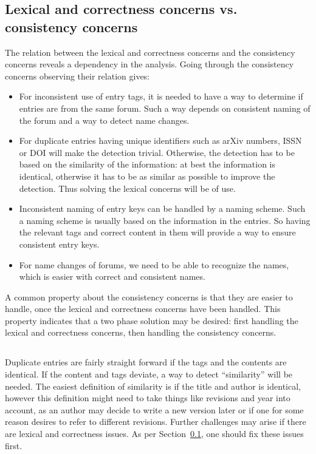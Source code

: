 \subsection{Lexical and correctness concerns vs. consistency concerns}
\label{sec:approach_lexical_consistency}

The relation between the lexical and correctness concerns and the
consistency concerns reveals a dependency in the analysis.  Going
through the consistency concerns observing their relation gives:

\begin{itemize}
\item For inconsistent use of entry tags, it is needed to have a way
  to determine if entries are from the same forum.  Such a
  way depends on consistent naming of the forum and a way to detect
  name changes.

\item For duplicate entries having unique identifiers such as arXiv
  numbers, ISSN or DOI will make the detection trivial.  Otherwise,
  the detection has to be based on the similarity of the information:
  at best the information is identical, otherwise it has to be as
  similar as possible to improve the detection.  Thus solving the
  lexical concerns will be of use.

\item Inconsistent naming of entry keys can be handled by a naming
  scheme.  Such a naming scheme is usually based on the information in
  the entries.  So having the relevant tags and correct content in
  them will provide a way to ensure consistent entry keys.

\item For name changes of forums, we need to be able to recognize the
  names, which is easier with correct and consistent names.
\end{itemize}

A common property about the consistency concerns is that they are
easier to handle, once the lexical and correctness concerns have been
handled.  This property indicates that a two phase solution may be
desired: first handling the lexical and correctness concerns, then
handling the consistency concerns.


\subsection{}
\label{sec:approach_duplicates}

Duplicate entries are fairly straight forward if the tags and the
contents are identical.  If the content and tags deviate, a way to
detect ``similarity'' will be needed.  The easiest definition of
similarity is if the title and author is identical, however this
definition might need to take things like revisions and year into
account, as an author may decide to write a new version later or if
one for some reason desires to refer to different revisions.  Further
challenges may arise if there are lexical and correctness issues.  As
per Section~\ref{sec:approach_lexical_consistency}, one should fix
these issues first.


